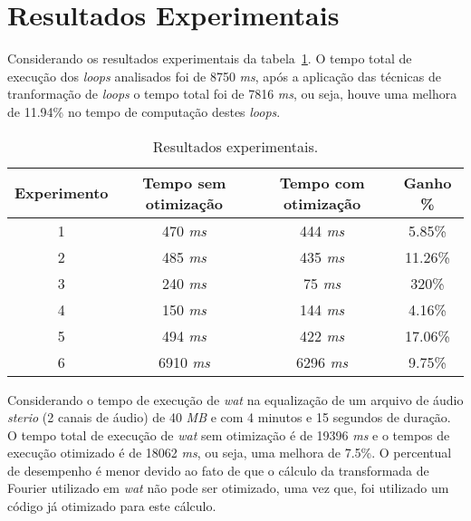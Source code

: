 \section{Resultados Experimentais}

Considerando os resultados experimentais da tabela~\ref{tabela_resultados}.
O tempo total de execução dos \textit{loops} analisados foi de 8750 \textit{ms},
após a aplicação das técnicas de tranformação de \textit{loops} o tempo total
foi de 7816 \textit{ms}, ou seja, houve uma melhora de 11.94\% no tempo de  
computação destes \textit{loops}.

\begin{table}[h]
  \caption{Resultados experimentais.}
  \label{tabela_resultados}
\begin{center}
  \begin{tabular}{c|c|c|c}
    Experimento & Tempo sem otimização & Tempo com otimização & Ganho \%\\
    \hline
    1 & 470 \textit{ms} & 444 \textit{ms} & 5.85\% \\
    \hline
    2 & 485 \textit{ms} & 435 \textit{ms} & 11.26\% \\
    \hline
    3 & 240 \textit{ms} & 75 \textit{ms} & 320\% \\
    \hline
    4 & 150 \textit{ms} & 144 \textit{ms} & 4.16\% \\
    \hline
    5 & 494 \textit{ms} & 422 \textit{ms} & 17.06\% \\
    \hline
    6 & 6910 \textit{ms} & 6296 \textit{ms} & 9.75\% \\
    \hline
  \end{tabular}
\end{center}
\end{table}

Considerando o tempo de execução de \textit{wat} na equalização de um
arquivo de áudio \textit{sterio} (2 canais de áudio) de 40 \textit{MB} e
com 4 minutos e 15 segundos de duração. 
O tempo total de execução de \textit{wat} sem otimização é de 19396 \textit{ms} 
e o tempos de execução otimizado é de 18062 \textit{ms}, ou seja, uma melhora de 
7.5\%. 
O percentual de desempenho é menor devido ao fato de que o cálculo da
transformada de Fourier \cite{fft} utilizado em \textit{wat} não pode ser otimizado, uma
vez que, foi utilizado um código já otimizado para este cálculo.
